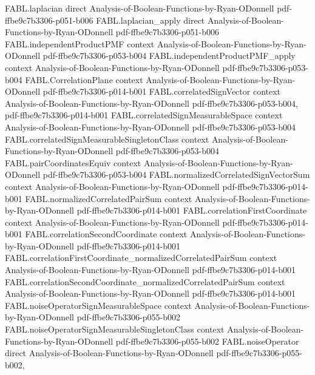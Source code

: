 \begin{theorem}
\proofstep
  {FABL.laplacian}
  {direct}
  {Analysis-of-Boolean-Functions-by-Ryan-ODonnell}
  {pdf-ffbe9c7b3306-p051-b006}
\proofstep
  {FABL.laplacian_apply}
  {direct}
  {Analysis-of-Boolean-Functions-by-Ryan-ODonnell}
  {pdf-ffbe9c7b3306-p051-b006}
\proofstep
  {FABL.independentProductPMF}
  {context}
  {Analysis-of-Boolean-Functions-by-Ryan-ODonnell}
  {pdf-ffbe9c7b3306-p053-b004}
\proofstep
  {FABL.independentProductPMF_apply}
  {context}
  {Analysis-of-Boolean-Functions-by-Ryan-ODonnell}
  {pdf-ffbe9c7b3306-p053-b004}
\proofstep
  {FABL.CorrelationPlane}
  {context}
  {Analysis-of-Boolean-Functions-by-Ryan-ODonnell}
  {pdf-ffbe9c7b3306-p014-b001}
\proofstep
  {FABL.correlatedSignVector}
  {context}
  {Analysis-of-Boolean-Functions-by-Ryan-ODonnell}
  {pdf-ffbe9c7b3306-p053-b004,
    pdf-ffbe9c7b3306-p014-b001}
\proofstep
  {FABL.correlatedSignMeasurableSpace}
  {context}
  {Analysis-of-Boolean-Functions-by-Ryan-ODonnell}
  {pdf-ffbe9c7b3306-p053-b004}
\proofstep
  {FABL.correlatedSignMeasurableSingletonClass}
  {context}
  {Analysis-of-Boolean-Functions-by-Ryan-ODonnell}
  {pdf-ffbe9c7b3306-p053-b004}
\proofstep
  {FABL.pairCoordinatesEquiv}
  {context}
  {Analysis-of-Boolean-Functions-by-Ryan-ODonnell}
  {pdf-ffbe9c7b3306-p053-b004}
\proofstep
  {FABL.normalizedCorrelatedSignVectorSum}
  {context}
  {Analysis-of-Boolean-Functions-by-Ryan-ODonnell}
  {pdf-ffbe9c7b3306-p014-b001}
\proofstep
  {FABL.normalizedCorrelatedPairSum}
  {context}
  {Analysis-of-Boolean-Functions-by-Ryan-ODonnell}
  {pdf-ffbe9c7b3306-p014-b001}
\proofstep
  {FABL.correlationFirstCoordinate}
  {context}
  {Analysis-of-Boolean-Functions-by-Ryan-ODonnell}
  {pdf-ffbe9c7b3306-p014-b001}
\proofstep
  {FABL.correlationSecondCoordinate}
  {context}
  {Analysis-of-Boolean-Functions-by-Ryan-ODonnell}
  {pdf-ffbe9c7b3306-p014-b001}
\proofstep
  {FABL.correlationFirstCoordinate_normalizedCorrelatedPairSum}
  {context}
  {Analysis-of-Boolean-Functions-by-Ryan-ODonnell}
  {pdf-ffbe9c7b3306-p014-b001}
\proofstep
  {FABL.correlationSecondCoordinate_normalizedCorrelatedPairSum}
  {context}
  {Analysis-of-Boolean-Functions-by-Ryan-ODonnell}
  {pdf-ffbe9c7b3306-p014-b001}
\proofstep
  {FABL.noiseOperatorSignMeasurableSpace}
  {context}
  {Analysis-of-Boolean-Functions-by-Ryan-ODonnell}
  {pdf-ffbe9c7b3306-p055-b002}
\proofstep
  {FABL.noiseOperatorSignMeasurableSingletonClass}
  {context}
  {Analysis-of-Boolean-Functions-by-Ryan-ODonnell}
  {pdf-ffbe9c7b3306-p055-b002}
\proofstep
  {FABL.noiseOperator}
  {direct}
  {Analysis-of-Boolean-Functions-by-Ryan-ODonnell}
  {pdf-ffbe9c7b3306-p055-b002,
}
\end{theorem}

